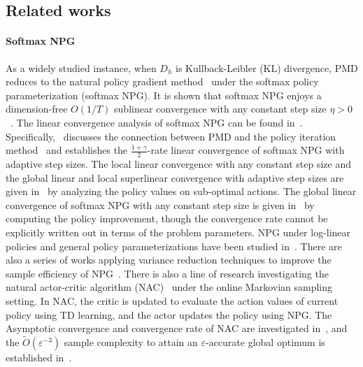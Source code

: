 \documentclass[10pt]{article}
\theoremstyle{plain}
\theoremstyle{definition}
\begin{document}
\subsection{Related works}\label{app:pmd}

\paragraph{Softmax NPG} As a widely studied instance, when $D_h$ is Kullback-Leibler (KL) divergence, PMD reduces to the natural policy gradient method~\cite{kakade2002npg} under the softmax policy parameterization (softmax NPG). It is shown that softmax NPG enjoys a dimension-free $O(1/T)$ sublinear convergence with any constant step size $\eta > 0$~\cite{Agarwal_Kakade_Lee_Mahajan_2019}. The linear convergence analysis of softmax NPG can be found in~\cite{Bhandari_Russo_2021,Khodadadian_Jhunjhunwala_Varma_Maguluri_2021,pg-liu}. Specifically,~\cite{Bhandari_Russo_2021} discusses the connection between PMD and the policy iteration method~\cite{VI-PI,suttonRL} and establishes the $\frac{1+\gamma}{2}$-rate linear convergence of softmax NPG with adaptive step sizes. The local linear convergence with any constant step size and the global linear and local superlinear convergence with adaptive step sizes are given in~\cite{Khodadadian_Jhunjhunwala_Varma_Maguluri_2021} by  analyzing the policy values on sub-optimal actions. The global linear convergence of softmax NPG with any constant step size is given in~\cite{pg-liu} by computing the policy improvement, though the convergence rate cannot be explicitly written out in terms of the problem parameters. NPG under log-linear policies and general policy parameterizations have been studied in~\cite{Agarwal_Kakade_Lee_Mahajan_2019,yuan2022linear}. There are also a series of works applying variance reduction techniques to improve the sample efficiency of NPG~\cite{feng2024global,liu2020improved,mondal2024improved}.
{There is also a line of research investigating the natural actor-critic algorithm (NAC)~\cite{peters2008natural} under the online Markovian sampling setting. In NAC, the critic is updated to evaluate the action values of current policy using TD learning, and the actor updates the policy using NPG. The Asymptotic convergence and convergence rate of NAC are investigated in~\cite{khodadadian2021finite,khodadadian2022finite,xu2020improving,yang2019provably,hong2023two,wang2019neural,xu2020non,wang2024non}, and the $\tilde{O}(\varepsilon^{-3})$ sample complexity to attain an $\varepsilon$-accurate global optimum is established in~\cite{xu2020improving}.}
\end{document}
